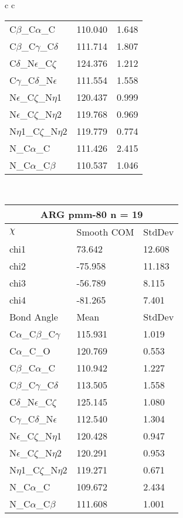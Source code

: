 \begin{longtable}{ c c }
\begin{tabular}{ l l l }
  C$\beta$\_C$\alpha$\_C & 110.040 & 1.648\\
  C$\beta$\_C$\gamma$\_C$\delta$ & 111.714 & 1.807\\
  C$\delta$\_N$\epsilon$\_C$\zeta$ & 124.376 & 1.212\\
  C$\gamma$\_C$\delta$\_N$\epsilon$ & 111.554 & 1.558\\
  N$\epsilon$\_C$\zeta$\_N$\eta$1 & 120.437 & 0.999\\
  N$\epsilon$\_C$\zeta$\_N$\eta$2 & 119.768 & 0.969\\
  N$\eta$1\_C$\zeta$\_N$\eta$2 & 119.779 & 0.774\\
  N\_C$\alpha$\_C & 111.426 & 2.415\\
  N\_C$\alpha$\_C$\beta$ & 110.537 & 1.046\\
  \bottomrule
  \end{tabular}
  \\
  \begin{tabular}{ l l l }
  \toprule
  \multicolumn{3}{c}{ARG \textbf{pmm-80} n = 19} \\ \toprule
  $\chi$       & Smooth COM & StdDev \\ \midrule
  chi1 & 73.642 & 12.608 \\ 
  chi2 & -75.958 & 11.183 \\ 
  chi3 & -56.789 & 8.115 \\ 
  chi4 & -81.265 & 7.401 \\ \midrule
  Bond Angle   & Mean     & StdDev \\ \midrule
  C$\alpha$\_C$\beta$\_C$\gamma$ & 115.931 & 1.019\\
  C$\alpha$\_C\_O & 120.769 & 0.553\\
  C$\beta$\_C$\alpha$\_C & 110.942 & 1.227\\
  C$\beta$\_C$\gamma$\_C$\delta$ & 113.505 & 1.558\\
  C$\delta$\_N$\epsilon$\_C$\zeta$ & 125.145 & 1.080\\
  C$\gamma$\_C$\delta$\_N$\epsilon$ & 112.540 & 1.304\\
  N$\epsilon$\_C$\zeta$\_N$\eta$1 & 120.428 & 0.947\\
  N$\epsilon$\_C$\zeta$\_N$\eta$2 & 120.291 & 0.953\\
  N$\eta$1\_C$\zeta$\_N$\eta$2 & 119.271 & 0.671\\
  N\_C$\alpha$\_C & 109.672 & 2.434\\
  N\_C$\alpha$\_C$\beta$ & 111.608 & 1.001\\
  \bottomrule
  \end{tabular}

\end{longtable}
